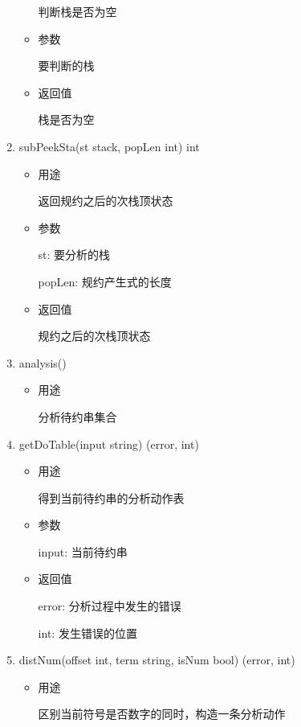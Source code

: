\documentclass[fontset=none,UTF8,a4paper,zihao=-4]{ctexart}
\begin{document}
\begin{enumerate}
\begin{itemize}
判断栈是否为空

\item 参数

要判断的栈

\item 返回值

栈是否为空
\end{itemize}

\item subPeekSta(st stack, popLen int) int

\begin{itemize}
\item 用途

返回规约之后的次栈顶状态

\item 参数

st:     要分析的栈

popLen: 规约产生式的长度

\item 返回值

规约之后的次栈顶状态
\end{itemize}

\item analysis()

\begin{itemize}
\item 用途

分析待约串集合
\end{itemize}

\item getDoTable(input string) (error, int)

\begin{itemize}
\item 用途

得到当前待约串的分析动作表

\item 参数

input: 当前待约串

\item 返回值

error: 分析过程中发生的错误

int:   发生错误的位置
\end{itemize}

\item distNum(offset int, term string, isNum bool) (error, int)

\begin{itemize}
\item 用途

区别当前符号是否数字的同时，构造一条分析动作


\end{itemize}
\end{enumerate}
\end{document}
